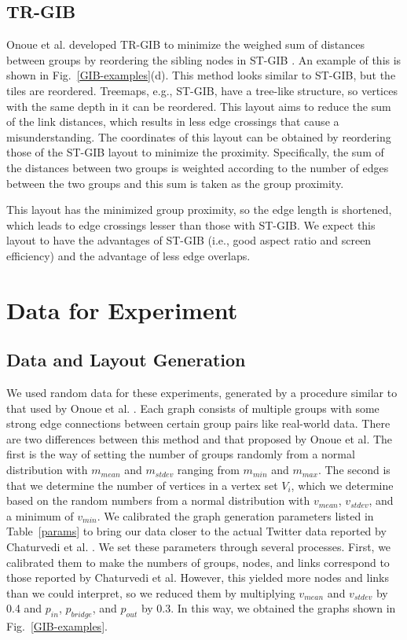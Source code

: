 \documentclass{vgtc}                          %
\begin{document}
\subsection{TR-GIB}
Onoue et al. developed TR-GIB to minimize the weighed sum of distances between groups by reordering the sibling nodes in ST-GIB \cite{onoue2017optimal}.
An example of this is shown in Fig.~\ref{GIB-examples}(d).
This method looks similar to ST-GIB, but the tiles are reordered.
Treemaps, e.g., ST-GIB, have a tree-like structure, so vertices with the same depth in it can be reordered.
This layout aims to reduce the sum of the link distances, which results in less edge crossings that cause a misunderstanding.
The coordinates of this layout can be obtained by reordering those of the ST-GIB layout to minimize the proximity.
Specifically, the sum of the distances between two groups is weighted according to the number of edges between the two groups and this sum is taken as the group proximity.

This layout has the minimized group proximity, so the edge length is shortened, which leads to edge crossings lesser than those with ST-GIB.
We expect this layout to have the advantages of ST-GIB (i.e., good aspect ratio and screen efficiency) and the advantage of less edge overlaps.

\section{Data for Experiment}

\subsection{Data and Layout Generation}
\label{layout}

We used random data for these experiments, generated by a procedure similar to that used by Onoue et al. \cite{onoue2017optimal}.
Each graph consists of multiple groups with some strong edge connections between certain group pairs like real-world data.
There are two differences between this method and that proposed by Onoue et al. The first is the way of setting the number of groups randomly from a normal distribution with $m_{mean}$ and $m_{stdev}$ ranging from $m_{min}$ and $m_{max}$.
The second is that we determine the number of vertices in a vertex set $V_i$, which we determine based on the random numbers from a normal distribution with $v_{mean}$, $v_{stdev}$, and a minimum of $v_{min}$.
We calibrated the graph generation parameters listed in Table~\ref{params} to bring our data closer to the actual Twitter data reported by Chaturvedi et al. \cite{chaturvedi2014group}.
We set these parameters through several processes.
First, we calibrated them to make the numbers of groups, nodes, and links correspond to those reported by Chaturvedi et al.
However, this yielded more nodes and links than we could interpret, so we reduced them by multiplying $v_{mean}$ and $v_{stdev}$ by 0.4 and $p_{in}$, $p_{bridge}$, and $p_{out}$ by 0.3.
In this way, we obtained the graphs shown in Fig.~\ref{GIB-examples}.
\end{document}

